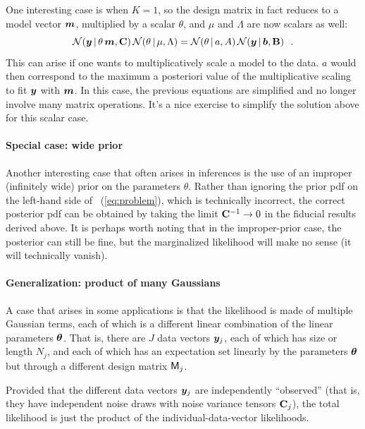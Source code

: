 One interesting case is when $K=1$, so the design matrix in fact
reduces to a model vector $\boldsymbol{m}$, multiplied by a scalar $\theta$, and
$\mu$ and $\Lambda$ are now scalars as well:
\begin{equation}
\mathcal{N}\!\,(\boldsymbol{y}\,|\,\theta\,\boldsymbol{m},\mathbf{C})\,\mathcal{N}\!\,(\theta\,|\,\mu,\Lambda) = \mathcal{N}\!\,(\theta\,|\, a,A)\,\mathcal{N}\!\,(\boldsymbol{y}\,|\,\boldsymbol{b},\mathbf{B})
~~.
\end{equation}
This can arise if one wants to multiplicatively scale a model to the data. $a$ would then correspond to the maximum a posteriori value of the multiplicative scaling to fit $\boldsymbol{y}$ with $\boldsymbol{m}$.
In this case, the previous equations are simplified and no longer
involve many matrix operations. It's a nice exercise to simplify the
solution above for this scalar case.

\paragraph{Special case: wide prior}
Another interesting case that often arises in inferences is the use of an improper
(infinitely wide) prior on the parameters $\theta$. Rather than
ignoring the prior pdf on the left-hand side of
\equationname~(\ref{eq:problem}), which is technically incorrect, the correct
posterior pdf can be obtained by taking the limit $\mathbf{C}^{-1} \rightarrow 0$ in the
fiducial results derived above. It is perhaps
worth noting that in the improper-prior case,
the posterior can still be fine, but the marginalized likelihood will make no sense (it will technically vanish).


\paragraph{Generalization: product of many Gaussians}

A case that arises in some applications is that the
likelihood is made of multiple Gaussian terms, each of which is a
different linear combination of the linear parameters $\boldsymbol{\theta}$.
That is, there are $J$ data vectors $\boldsymbol{y}_j$, each of which has size or length $N_j$,
and each of which has an expectation
set linearly by the parameters $\boldsymbol{\theta}$ but through a different design matrix $\mathsf{M}_j$.

Provided that the different data vectors $\boldsymbol{y}_j$ are independently ``observed'' (that
is, they have independent noise draws with noise variance tensors $\mathbf{C}_j$),
the total likelihood is just the product of
the individual-data-vector likelihoods.

